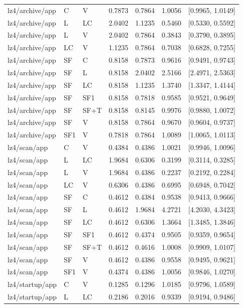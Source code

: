 \begin{longtable}{lllrrrr}
lz4/archive/app & C & V & 0.7873 & 0.7864 & 1.0056 & [0.9965, 1.0149] \\
lz4/archive/app & L & LC & 2.0402 & 1.1235 & 0.5460 & [0.5330, 0.5592] \\
lz4/archive/app & L & V & 2.0402 & 0.7864 & 0.3843 & [0.3790, 0.3895] \\
lz4/archive/app & LC & V & 1.1235 & 0.7864 & 0.7038 & [0.6828, 0.7255] \\
lz4/archive/app & SF & C & 0.8158 & 0.7873 & 0.9616 & [0.9491, 0.9743] \\
lz4/archive/app & SF & L & 0.8158 & 2.0402 & 2.5166 & [2.4971, 2.5363] \\
lz4/archive/app & SF & LC & 0.8158 & 1.1235 & 1.3740 & [1.3347, 1.4144] \\
lz4/archive/app & SF & SF1 & 0.8158 & 0.7818 & 0.9585 & [0.9521, 0.9649] \\
lz4/archive/app & SF & SF+T & 0.8158 & 0.8145 & 0.9976 & [0.9880, 1.0072] \\
lz4/archive/app & SF & V & 0.8158 & 0.7864 & 0.9670 & [0.9604, 0.9737] \\
lz4/archive/app & SF1 & V & 0.7818 & 0.7864 & 1.0089 & [1.0065, 1.0113] \\
lz4/scan/app & C & V & 0.4384 & 0.4386 & 1.0021 & [0.9946, 1.0096] \\
lz4/scan/app & L & LC & 1.9684 & 0.6306 & 0.3199 & [0.3114, 0.3285] \\
lz4/scan/app & L & V & 1.9684 & 0.4386 & 0.2237 & [0.2192, 0.2284] \\
lz4/scan/app & LC & V & 0.6306 & 0.4386 & 0.6995 & [0.6948, 0.7042] \\
lz4/scan/app & SF & C & 0.4612 & 0.4384 & 0.9538 & [0.9413, 0.9666] \\
lz4/scan/app & SF & L & 0.4612 & 1.9684 & 4.2721 & [4.2030, 4.3423] \\
lz4/scan/app & SF & LC & 0.4612 & 0.6306 & 1.3664 & [1.3485, 1.3846] \\
lz4/scan/app & SF & SF1 & 0.4612 & 0.4374 & 0.9505 & [0.9359, 0.9654] \\
lz4/scan/app & SF & SF+T & 0.4612 & 0.4616 & 1.0008 & [0.9909, 1.0107] \\
lz4/scan/app & SF & V & 0.4612 & 0.4386 & 0.9558 & [0.9495, 0.9621] \\
lz4/scan/app & SF1 & V & 0.4374 & 0.4386 & 1.0056 & [0.9846, 1.0270] \\
lz4/startup/app & C & V & 0.1285 & 0.1296 & 1.0185 & [0.9796, 1.0589] \\
lz4/startup/app & L & LC & 0.2186 & 0.2016 & 0.9339 & [0.9194, 0.9486] \\

\end{longtable}
